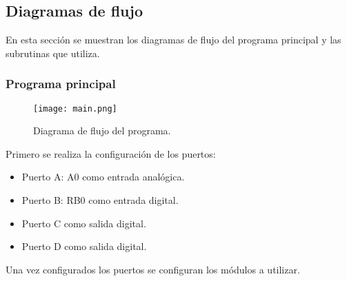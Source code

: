 \documentclass[12pt,a4paper]{article}
\begin{document}
\newpage
\subsection{Diagramas de flujo}
	En esta sección se muestran los diagramas de flujo del programa principal y las subrutinas que utiliza.
	
	\subsubsection{Programa principal}	
	
	\begin{figure}[H]
	\texttt{[image: main.png]}
	\centering
	\caption{Diagrama de flujo del programa.}
	\end{figure}		
	
	Primero se realiza la configuración de los puertos:
	
	\begin{itemize}
	\item Puerto A: A0 como entrada analógica.
	\item Puerto B: RB0 como entrada digital.
	\item Puerto C como salida digital.
	\item Puerto D como salida digital.
	\end{itemize}
	
	Una vez configurados los puertos se configuran los módulos a utilizar.
	
\end{document}
